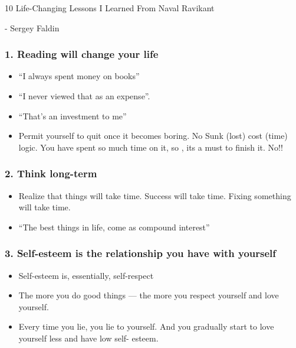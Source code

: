 \begin{frame}[fragile]\frametitle{}
\begin{center}
{\Large 10 Life-Changing Lessons I Learned From Naval
Ravikant}

{\small - Sergey Faldin}

\end{center}
\end{frame}

\begin{frame}[fragile]\frametitle{1. Reading will change your life}

\begin{itemize}
\item ``I always spent money on books''
\item ``I never viewed that as an expense''. 
\item ``That’s an investment to me''
\item  Permit yourself to quit once it becomes boring. No Sunk (lost) cost (time) logic. You have spent so much time on it, so , its a must to finish it. No!!
\end{itemize}

\end{frame}


\begin{frame}[fragile]\frametitle{2. Think long-term}

\begin{itemize}
\item  Realize that things will take time. Success will take time. Fixing
something will take time.
\item ``The best things in life, come as compound interest''
\end{itemize}

\end{frame}

\begin{frame}[fragile]\frametitle{3. Self-esteem is the relationship you have with yourself}

\begin{itemize}
\item Self-esteem is, essentially, self-respect
\item  The more you do good things — the more you respect yourself and love yourself. 
\item Every time
you lie, you lie to yourself. And you gradually start to love yourself less and have low self-
esteem.
\end{itemize}

\end{frame}

